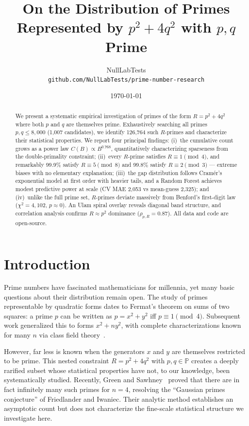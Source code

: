 \documentclass[12pt,a4paper]{article}
\title{On the Distribution of Primes Represented by $p^{2}+4q^{2}$ with $p,q$ Prime}
\author{NullLabTests \\ \texttt{github.com/NullLabTests/prime-number-research}}
\date{\today}
\begin{document}
\maketitle

\begin{abstract}
We present a systematic empirical investigation of primes of the form
$R = p^{2}+4q^{2}$ where both $p$ and $q$ are themselves prime.
Exhaustively searching all primes $p,q \leq 8{,}000$ (1,007 candidates),
we identify 126,764 such $R$-primes and characterize their statistical
properties. We report four principal findings: (i)~the cumulative count
grows as a power law $C(B) \propto B^{0.768}$, quantitatively
characterizing sparseness from the double-primality constraint;
(ii)~every $R$-prime satisfies $R \equiv 1 \pmod{4}$, and remarkably
99.9\% satisfy $R \equiv 5 \pmod{8}$ and 99.8\% satisfy
$R \equiv 2 \pmod{3}$ --- extreme biases with no elementary explanation;
(iii)~the gap distribution follows Cram\'er's exponential model at
first order with heavier tails, and a Random Forest achieves modest
predictive power at scale (CV MAE 2,053 vs mean-guess 2,325);
and (iv)~unlike the full prime set, $R$-primes deviate massively
from Benford's first-digit law ($\chi^{2}=4{,}102$, $p\approx0$).
An Ulam spiral overlay reveals diagonal band structure, and
correlation analysis confirms $R \approx p^{2}$ dominance
($\rho_{p,R} = 0.87$). All data and code are open-source.
\end{abstract}

\section{Introduction}

Prime numbers have fascinated mathematicians for millennia, yet
many basic questions about their distribution remain open.
The study of primes representable by quadratic forms dates to
Fermat's theorem on sums of two squares: a prime $p$ can be
written as $p = x^{2}+y^{2}$ iff $p \equiv 1 \pmod{4}$.
Subsequent work generalized this to forms $x^{2}+ny^{2}$,
with complete characterizations known for many $n$ via class
field theory~\cite{cox2013primes}.

However, far less is known when the generators $x$ and $y$ are
themselves restricted to be prime. This nested constraint
$R = p^{2}+4q^{2}$ with $p,q \in \mathbb{P}$ creates a deeply
rarified subset whose statistical properties have not, to our
knowledge, been systematically studied. Recently, Green and
Sawhney~\cite{green2024primes} proved that there are in fact
infinitely many such primes for $n=4$, resolving the ``Gaussian
primes conjecture'' of Friedlander and Iwaniec. Their analytic
method establishes an asymptotic count but does not characterize
the fine-scale statistical structure we investigate here.
\end{document}
